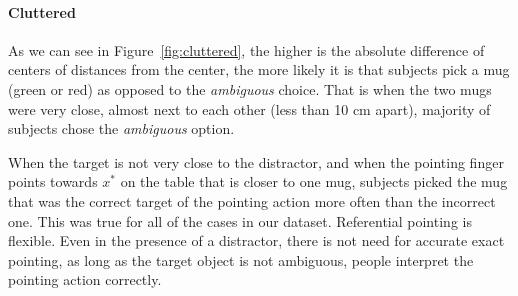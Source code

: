 \paragraph{Cluttered}




As we can see in Figure~\ref{fig:cluttered}, the higher is the absolute difference of centers of distances from the center, the more likely it is that subjects pick a mug (green or red) as opposed to the \textit{ambiguous} choice. That is when the two mugs were very close, almost next to each other (less than 10 cm apart), majority of subjects chose the \textit{ambiguous} option. 
 

When the target is not very close to the distractor, and when the pointing finger points towards $x^*$ on the table that is closer to one mug, subjects picked the mug that was the correct target of the pointing action more often than the incorrect one. This was true for all of the cases in our dataset. Referential pointing is flexible. Even in the presence of a distractor, there is not need for accurate exact pointing, as long as the target object is not ambiguous, people interpret the pointing action correctly.









